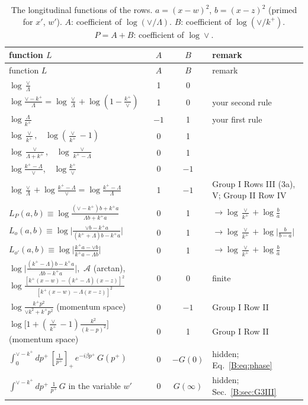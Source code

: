 \documentclass[10pt]{article}
\numberwithin{equation}{section}
\newcommand{\pp}{p^+}
\begin{document}
\begin{longtable}{@{}>{\raggedright\arraybackslash}p{}cc>{\raggedright\arraybackslash}p{}@{}}
\caption{The longitudinal functions of the rows. $a=(x-w)^2$, $b=(x-z)^2$ (primed for $x'$, $w'$). $A$: coefficient of $\log(\vee/\Lambda)$. $B$: coefficient of $\log(\vee/k^+)$. $P=A+B$: coefficient of $\log\vee$.}\label{B:tab:L}\\
\toprule
function $L$ & $A$ & $B$ & remark\\ \midrule\endfirsthead
\toprule function $L$ & $A$ & $B$ & remark\\ \midrule\endhead
$\log\frac{\vee}{\Lambda}$ & 1 & 0 & \\
$\log\frac{\vee-k^+}{\Lambda}=\log\frac{\vee}{\Lambda}+\log(1-\frac{k^+}{\vee})$ & 1 & 0 & your second rule\\
$\log\frac{\Lambda}{k^+}$ & $-1$ & 1 & your first rule\\
$\log\frac{\vee}{k^+}$,\ \ $\log(\frac{\vee}{k^+}-1)$ & 0 & 1 & \\
$\log\frac{\vee}{\Lambda+k^+}$,\ \ $\log\frac{\vee}{k^+-\Lambda}$ & 0 & 1 & \\
$\log\frac{k^+-\Lambda}{\vee}$,\ \ $\log\frac{k^+}{\vee}$ & 0 & $-1$ & \\
$\log\frac{\vee}{\Lambda}+\log\frac{k^+-\Lambda}{\vee}=\log\frac{k^+-\Lambda}{\Lambda}$ & 1 & $-1$ & Group I Rows III (3a), V; Group II Row IV\\
$L_P(a,b)\equiv\log\frac{(\vee-k^+)b+k^+a}{\Lambda b+k^+a}$ & 0 & 1 & $\to\log\frac{\vee}{k^+}+\log\frac{b}{a}$\\
$L_o(a,b)\equiv\log\Big|\frac{\vee b-k^+a}{(k^++\Lambda)b-k^+a}\Big|$ & 0 & 1 & $\to\log\frac{\vee}{k^+}+\log\big|\frac{b}{b-a}\big|$\\
$L_{o'}(a,b)\equiv\log\Big|\frac{k^+a-\vee b}{k^+a-\Lambda b}\Big|$ & 0 & 1 & $\to\log\frac{\vee}{k^+}+\log\frac{b}{a}$\\
$\log\Big|\frac{(k^+-\Lambda)b-k^+a}{\Lambda b-k^+a}\Big|$,\ $\mathcal A$ (arctan), $\log\frac{[k^+(x-w)-(k^+-\Lambda)(x-z)]^2}{[k^+(x-w)-\Lambda(x-z)]^2}$ & 0 & 0 & finite\\
$\log\frac{k^+p^2}{\vee k^2+k^+p^2}$ (momentum space) & 0 & $-1$ & Group I Row II\\
$\log\big[1+(\frac{\vee}{k^+}-1)\frac{k^2}{(k-p)^2}\big]$ (momentum space) & 0 & 1 & Group I Row II\\
$\int_0^{\vee-k^+}d\pp\,[\frac1{\pp}]_+\,e^{-i\beta\pp}\,G(\pp)$ & 0 & $-G(0)$ & hidden; Eq.~\eqref{B:eq:phase}\\
$\int^{\vee-k^+}d\pp\,\frac{1}{\pp}\,G$ in the variable $w'$ & 0 & $G(\infty)$ & hidden; Sec.~\ref{B:sec:G3III}\\
\bottomrule
\end{longtable}
\end{document}
